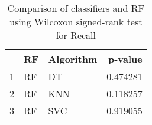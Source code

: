 \begin{table}
\footnotesize
\caption{Comparison of classifiers and RF using Wilcoxon signed-rank test for Recall}
\label{tab:RF wilcoxon Recall comparison}
\begin{tabular}{lllr}
\hline
 & RF & Algorithm & p-value \\
\hline
1 & RF & DT & 0.474281 \\
2 & RF & KNN & 0.118257 \\
3 & RF & SVC & 0.919055 \\
\hline
\end{tabular}
\end{table}
